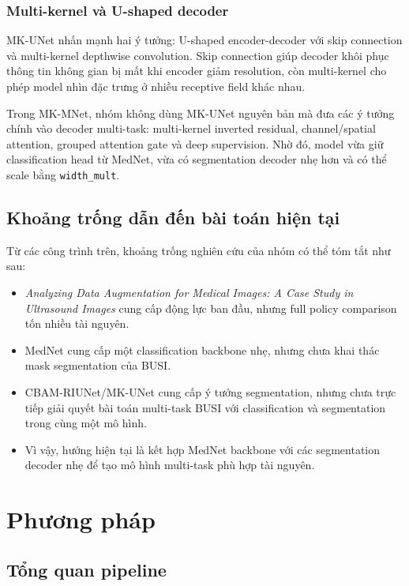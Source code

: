 \documentclass[12pt,a4paper]{article}
\begin{document}
\subsubsection*{Multi-kernel và U-shaped decoder}

MK-UNet nhấn mạnh hai ý tưởng: U-shaped encoder-decoder với skip connection và multi-kernel depthwise convolution. Skip connection giúp decoder khôi phục thông tin không gian bị mất khi encoder giảm resolution, còn multi-kernel cho phép model nhìn đặc trưng ở nhiều receptive field khác nhau.

Trong MK-MNet, nhóm không dùng MK-UNet nguyên bản mà đưa các ý tưởng chính vào decoder multi-task: multi-kernel inverted residual, channel/spatial attention, grouped attention gate và deep supervision. Nhờ đó, model vừa giữ classification head từ MedNet, vừa có segmentation decoder nhẹ hơn và có thể scale bằng \texttt{width\_mult}.

\subsection{Khoảng trống dẫn đến bài toán hiện tại}

Từ các công trình trên, khoảng trống nghiên cứu của nhóm có thể tóm tắt như sau:

\begin{itemize}
    \item \textit{Analyzing Data Augmentation for Medical Images: A Case Study in Ultrasound Images} cung cấp động lực ban đầu, nhưng full policy comparison tốn nhiều tài nguyên.
    \item MedNet cung cấp một classification backbone nhẹ, nhưng chưa khai thác mask segmentation của BUSI.
    \item CBAM-RIUNet/MK-UNet cung cấp ý tưởng segmentation, nhưng chưa trực tiếp giải quyết bài toán multi-task BUSI với classification và segmentation trong cùng một mô hình.
    \item Vì vậy, hướng hiện tại là kết hợp MedNet backbone với các segmentation decoder nhẹ để tạo mô hình multi-task phù hợp tài nguyên.
\end{itemize}

\section{Phương pháp}

\subsection{Tổng quan pipeline}
\end{document}
